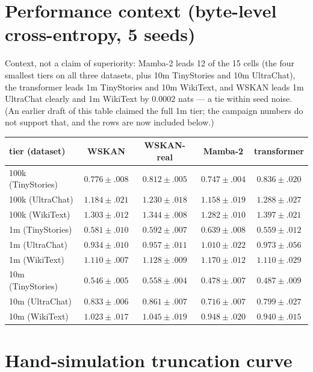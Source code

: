 \documentclass[11pt]{article}
\newcommand{\wskan}{WSKAN}
\begin{document}
\section{Performance context (byte-level cross-entropy, 5 seeds)}

Context, not a claim of superiority: Mamba-2 leads 12 of the 15 cells
(the four smallest tiers on all three datasets, plus 10m TinyStories and
10m UltraChat), the transformer leads 1m TinyStories and 10m WikiText, and
\wskan{} leads 1m UltraChat clearly and 1m WikiText by $0.0002$ nats ---
a tie within seed noise. (An earlier draft of this table claimed the full
1m tier; the campaign numbers do not support that, and the rows are now
included below.)

\begin{center}
\begin{tabular}{lcccc}
\toprule
tier (dataset) & \wskan{} & \wskan{}-real & Mamba-2 & transformer \\
\midrule
100k (TinyStories) & $0.776{\pm}.008$ & $0.812{\pm}.005$ & $\mathbf{0.747{\pm}.004}$ & $0.836{\pm}.020$ \\
100k (UltraChat) & $1.184{\pm}.021$ & $1.230{\pm}.018$ & $\mathbf{1.158{\pm}.019}$ & $1.288{\pm}.027$ \\
100k (WikiText) & $1.303{\pm}.012$ & $1.344{\pm}.008$ & $\mathbf{1.282{\pm}.010}$ & $1.397{\pm}.021$ \\
1m (TinyStories) & $0.581{\pm}.010$ & $0.592{\pm}.007$ & $0.639{\pm}.008$ & $\mathbf{0.559{\pm}.012}$ \\
1m (UltraChat) & $\mathbf{0.934{\pm}.010}$ & $0.957{\pm}.011$ & $1.010{\pm}.022$ & $0.973{\pm}.056$ \\
1m (WikiText) & $\mathbf{1.110{\pm}.007}$ & $1.128{\pm}.009$ & $1.170{\pm}.012$ & $1.110{\pm}.029$ \\
10m (TinyStories) & $0.546{\pm}.005$ & $0.558{\pm}.004$ & $\mathbf{0.478{\pm}.007}$ & $0.487{\pm}.009$ \\
10m (UltraChat) & $0.833{\pm}.006$ & $0.861{\pm}.007$ & $\mathbf{0.716{\pm}.007}$ & $0.799{\pm}.027$ \\
10m (WikiText) & $1.023{\pm}.017$ & $1.045{\pm}.019$ & $0.948{\pm}.020$ & $\mathbf{0.940{\pm}.015}$ \\
\bottomrule
\end{tabular}
\end{center}

\section{Hand-simulation truncation curve}
\end{document}
